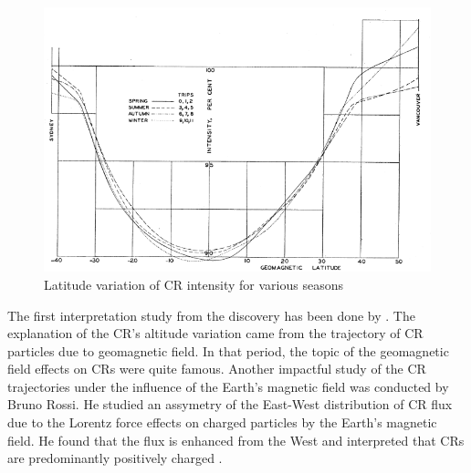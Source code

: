 \begin{figure}[h!]
    \centering
    \includegraphics[width=\textwidth]{content/background/figures/compton_sail_1937.png}
    \caption{
        Latitude variation of CR intensity for various seasons 
        \citep{compton1937cosmic}
    }
    \label{fig:comptonship}
\end{figure}
	
The first interpretation study from the discovery has been
done by \cite{stormer1934critical}. The explanation of the CR's altitude variation
came from the trajectory of CR particles due to geomagnetic field.
In that period, the topic of the geomagnetic field
effects on CRs were quite famous.
Another impactful study of the
CR trajectories under the influence of the
Earth's magnetic field was conducted by
Bruno Rossi. He studied an assymetry of the East-West distribution
of CR flux due to the Lorentz force effects on charged particles
by the Earth's magnetic field. He found that the flux is enhanced
from the West and interpreted that CRs are predominantly
positively charged \citep{rossi1941cosmic}.


